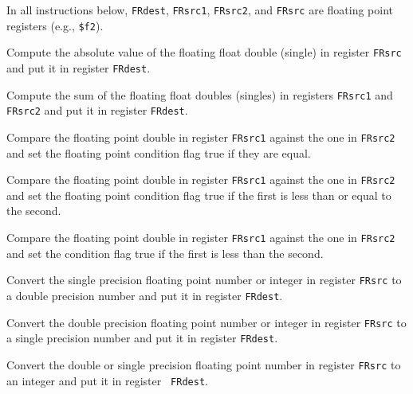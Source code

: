 \documentclass[11pt]{article}
\begin{document}
In all instructions below, {\tt FRdest}, {\tt FRsrc1}, {\tt FRsrc2},
and {\tt FRsrc} are floating point registers (e.g., {\tt \$f2}).

Compute the absolute value of the floating float double (single) in
register {\tt FRsrc} and put it in register {\tt FRdest}.

Compute the sum of the floating float doubles (singles) in registers
{\tt FRsrc1} and {\tt FRsrc2} and put it in register {\tt FRdest}.

Compare the floating point double in register {\tt FRsrc1} against
the one in {\tt FRsrc2} and set the floating point condition flag
true if they are equal.

Compare the floating point double in register {\tt FRsrc1} against
the one in {\tt FRsrc2} and set the floating point condition flag
true if the first is less than or equal to the second.

Compare the floating point double in register {\tt FRsrc1} against
the one in {\tt FRsrc2} and set the condition flag true if the first
is less than the second.

Convert the single precision floating point number or integer in
register {\tt FRsrc} to a double precision number and put it in
register {\tt FRdest}.

Convert the double precision floating point number or integer in
register {\tt FRsrc} to a single precision number and put it in
register {\tt FRdest}.

Convert the double or single precision floating point number in
register {\tt FRsrc} to an integer and put it in register {\tt
FRdest}.
\end{document}
